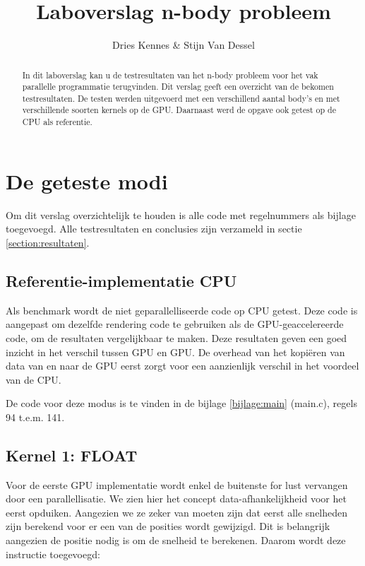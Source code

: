 \documentclass[a4paper]{article}
\title{Laboverslag n-body probleem}
\author{Dries Kennes \& Stijn Van Dessel}
\begin{document}
\maketitle

\begin{abstract}
In dit laboverslag kan u de testresultaten van het n-body probleem voor het vak parallelle programmatie terugvinden. Dit verslag geeft een overzicht van de bekomen testresultaten. 
De testen werden uitgevoerd met een verschillend aantal body's en met verschillende soorten kernels op de GPU. Daarnaast werd de opgave ook getest op de CPU als referentie.
\end{abstract}

\section{De geteste modi}

Om dit verslag overzichtelijk te houden is alle code met regelnummers als bijlage toegevoegd. Alle testresultaten en conclusies zijn verzameld in sectie \ref{section:resultaten}.

\subsection{Referentie-implementatie CPU}

Als benchmark wordt de niet geparallelliseerde code op CPU getest. Deze code is aangepast om dezelfde rendering code te gebruiken als de GPU-geaccelereerde code, om de resultaten vergelijkbaar te maken. Deze resultaten geven een goed inzicht in het verschil tussen GPU en GPU. De overhead van het kopiëren van data van en naar de GPU eerst zorgt voor een aanzienlijk verschil in het voordeel van de CPU.

De code voor deze modus is te vinden in de bijlage \ref{bijlage:main} (main.c), regels 94 t.e.m. 141.

\subsection{Kernel 1: FLOAT}

Voor de eerste GPU implementatie wordt enkel de buitenste for lust vervangen door een parallellisatie. We zien hier het concept data-afhankelijkheid voor het eerst opduiken.
Aangezien we ze zeker van moeten zijn dat eerst alle snelheden zijn berekend voor er een van de posities wordt gewijzigd. Dit is belangrijk aangezien de positie nodig is om de snelheid te berekenen. Daarom wordt deze instructie toegevoegd:
\end{document}
